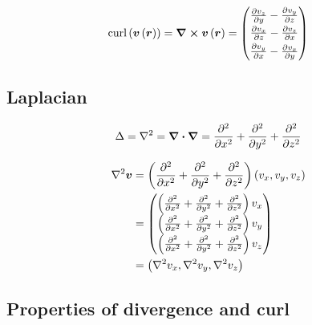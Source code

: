 \documentclass{article}
\renewcommand{\vec}[1]{\boldsymbol{#1}}
\begin{document}
\[ \text{curl}\left(\vec{v} \left( \vec{r} \right)\right) = \curl{\vec{v} \left( \vec{r} \right)} = \begin{pmatrix} \frac{\partial{ v_z }}{\partial{ y }} - \frac{\partial{ v_y }}{\partial{ z }} \\[0.3em] \frac{\partial{ v_x }}{\partial{ z }} - \frac{\partial{ v_z }}{\partial{ x }} \\[0.3em] \frac{\partial{ v_y }}{\partial{ x }} - \frac{\partial{ v_x }}{\partial{ y }} \end{pmatrix} \]

\subsection{Laplacian}

\[ \Delta = \laplacian = \div \grad = \frac{\partial^{2} {  }}{\partial{ x^{2} }} + \frac{\partial^{2} {  }}{\partial{ y^{2} }} + \frac{\partial^{2} {  }}{\partial{ z^{2} }} \]

\begin{align*}
    \laplacian{\vec{v}} &= \left( \frac{\partial^{2} {  }}{\partial{ x^{2} }} + \frac{\partial^{2} {  }}{\partial{ y^{2} }} + \frac{\partial^{2} {  }}{\partial{ z^{2} }} \right) \left( v_x , v_y , v_z \right) \\
    &= \begin{pmatrix} \left( \frac{\partial^{2} {  }}{\partial{ x^{2} }} + \frac{\partial^{2} {  }}{\partial{ y^{2} }} + \frac{\partial^{2} {  }}{\partial{ z^{2} }} \right) v_x \\ \left( \frac{\partial^{2} {  }}{\partial{ x^{2} }} + \frac{\partial^{2} {  }}{\partial{ y^{2} }} + \frac{\partial^{2} {  }}{\partial{ z^{2} }} \right) v_y \\ \left( \frac{\partial^{2} {  }}{\partial{ x^{2} }} + \frac{\partial^{2} {  }}{\partial{ y^{2} }} + \frac{\partial^{2} {  }}{\partial{ z^{2} }} \right) v_z \end{pmatrix} \\
    &= \left( \laplacian{v_x} , \laplacian{v_y} , \laplacian{v_z} \right)
\end{align*}

\subsection{Properties of divergence and curl}
\end{document}
